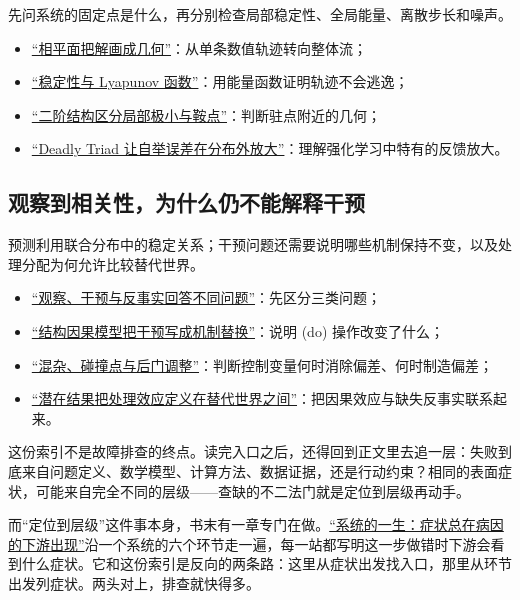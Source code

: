 先问系统的固定点是什么，再分别检查局部稳定性、全局能量、离散步长和噪声。

\begin{itemize}
\tightlist
\item \hyperref[sec:15-Differential-Equations-and-Dynamical-Systems/02-Stability-and-Dynamical-Systems/01]{``相平面把解画成几何''}：从单条数值轨迹转向整体流；
\item \hyperref[sec:15-Differential-Equations-and-Dynamical-Systems/02-Stability-and-Dynamical-Systems/02]{``稳定性与 Lyapunov 函数''}：用能量函数证明轨迹不会逃逸；
\item \hyperref[sec:09-Convex-Optimization/08-Nonconvex-and-Stochastic-Optimization/02]{``二阶结构区分局部极小与鞍点''}：判断驻点附近的几何；
\item \hyperref[sec:16-Control-and-Reinforcement-Learning/02-Reinforcement-Learning/06]{``Deadly Triad 让自举误差在分布外放大''}：理解强化学习中特有的反馈放大。
\end{itemize}

\subsection{观察到相关性，为什么仍不能解释干预}

预测利用联合分布中的稳定关系；干预问题还需要说明哪些机制保持不变，以及处理分配为何允许比较替代世界。

\begin{itemize}
\tightlist
\item \hyperref[sec:13-Machine-Learning/12-Causal-Inference/01]{``观察、干预与反事实回答不同问题''}：先区分三类问题；
\item \hyperref[sec:13-Machine-Learning/12-Causal-Inference/02]{``结构因果模型把干预写成机制替换''}：说明 (do) 操作改变了什么；
\item \hyperref[sec:13-Machine-Learning/12-Causal-Inference/03]{``混杂、碰撞点与后门调整''}：判断控制变量何时消除偏差、何时制造偏差；
\item \hyperref[sec:13-Machine-Learning/12-Causal-Inference/04]{``潜在结果把处理效应定义在替代世界之间''}：把因果效应与缺失反事实联系起来。
\end{itemize}

这份索引不是故障排查的终点。读完入口之后，还得回到正文里去追一层：失败到底来自问题定义、数学模型、计算方法、数据证据，还是行动约束？相同的表面症状，可能来自完全不同的层级——查缺的不二法门就是定位到层级再动手。

而``定位到层级''这件事本身，书末有一章专门在做。\hyperref[ch:144]{``系统的一生：症状总在病因的下游出现''}沿一个系统的六个环节走一遍，每一站都写明这一步做错时下游会看到什么症状。它和这份索引是反向的两条路：这里从症状出发找入口，那里从环节出发列症状。两头对上，排查就快得多。
